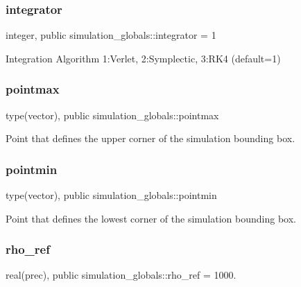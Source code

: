 \subsubsection{\texorpdfstring{integrator}{integrator}}
{\footnotesize\ttfamily integer, public simulation\+\_\+globals\+::integrator = 1}



Integration Algorithm 1\+:Verlet, 2\+:Symplectic, 3\+:R\+K4 (default=1) 

\mbox{\label{namespacesimulation__globals_aa7feec60259c6f63f3dba3a523ed5a60}} 
\subsubsection{\texorpdfstring{pointmax}{pointmax}}
{\footnotesize\ttfamily type(vector), public simulation\+\_\+globals\+::pointmax}



Point that defines the upper corner of the simulation bounding box. 

\mbox{\label{namespacesimulation__globals_ab2427b2b4beb2d54ecc2b61862c09dcf}} 
\subsubsection{\texorpdfstring{pointmin}{pointmin}}
{\footnotesize\ttfamily type(vector), public simulation\+\_\+globals\+::pointmin}



Point that defines the lowest corner of the simulation bounding box. 

\mbox{\label{namespacesimulation__globals_a401ef3172f26620b9e089d7b297b36a0}} 
\subsubsection{\texorpdfstring{rho\+\_\+ref}{rho\_ref}}
{\footnotesize\ttfamily real(prec), public simulation\+\_\+globals\+::rho\+\_\+ref = 1000.}



